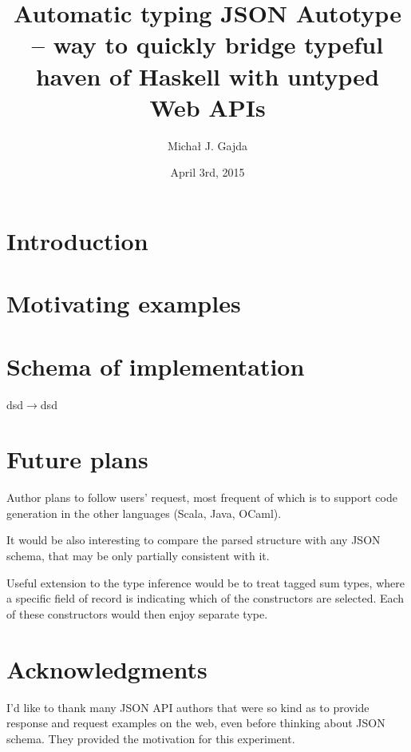 \documentclass[11pt]{article}
\title{\textbf{Automatic typing JSON Autotype -- way to quickly bridge typeful haven of Haskell with untyped Web APIs}}
\author{Micha\l{} J. Gajda}
\date{April 3rd, 2015}
\begin{document}
\maketitle



\section{Introduction}

\section{Motivating examples}

\section{Schema of implementation}
dsd$\rightarrow{}$dsd
\section{Future plans}
Author plans to follow users' request, most frequent of which is to support code generation in the other languages (Scala, Java, OCaml).

It would be also interesting to compare the parsed structure with any JSON schema, that may be only partially consistent with it.

Useful extension to the type inference would be to treat tagged sum types, where a specific field of record is indicating which of the constructors are selected. Each of these constructors would then enjoy separate type.

\section{Acknowledgments}
I'd like to thank many JSON API authors that were so kind as to provide response and request examples on the web, even before thinking about JSON schema. They provided the motivation for this experiment.
\end{document}
